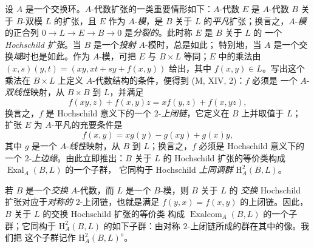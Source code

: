 \begin{env}[18.4.3]
\label{0.18.4.3-fr}
设 $A$ 是一个交换环。$A$-代数扩张的一类重要情形如下：$A$-代数 $E$ 是
$A$-代数 $B$ 关于 $B$-双模 $L$ 的扩张，且 $E$ 作为 $A$-\emph{模}，是
$B$ 关于 $L$ 的\emph{平凡}扩张；换言之，$A$-\emph{模}的正合列
$0\to L\to E\to B\to0$ 是\emph{分裂的}。此时称 $E$ 是 $B$ 关于 $L$ 的
一个 \emph{Hochschild 扩张}。当 $B$ 是一个\emph{投射} $A$-模时，总是如此；
特别地，当 $A$ 是一个交换\emph{域}时也是如此。作为 $A$-模，可把 $E$ 与
$B\times L$ 等同；$E$ 中的乘法由
$(x,s)(y,t)=(xy,xt+sy+f(x,y))$ 给出，其中 $f(x,y)\in L$。写出这个乘法在
$B\times L$ 上定义 $A$-代数结构的条件，便得到 (M, XIV, 2)：$f$ 必须是
一个 $A$-\emph{双线性}映射，从 $B\times B$ 到 $L$，并满足
\begin{equation}
\label{0.18.4.3.1-fr}
\tag{18.4.3.1}
  f(xy,z)+f(x,y)z=xf(y,z)+f(x,yz),
\end{equation}
换言之，$f$ 是 Hochschild 意义下的一个 $2$-\emph{上闭链}，它定义在 $B$
上并取值于 $L$；
扩张 $E$ 为 $A$-平凡的充要条件是
\begin{equation}
\label{0.18.4.3.2-fr}
\tag{18.4.3.2}
  f(x,y)=xg(y)-g(xy)+g(x)y,
\end{equation}
其中 $g$ 是一个 $A$-\emph{线性}映射，从 $B$ 到 $L$；换言之，$f$ 必须是
Hochschild 意义下的一个 $2$-\emph{上边缘}。由此立即推出：$B$ 关于 $L$ 的
Hochschild 扩张的等价类构成 $\operatorname{Exal}_A(B,L)$ 的一个子群，
它同构于 Hochschild \emph{上同调群} $\mathrm H_A^2(B,L)$。

若 $B$ 是一个\emph{交换} $A$-代数，而 $L$ 是一个 $B$-模，则 $B$ 关于 $L$ 的
\emph{交换} Hochschild 扩张对应于\emph{对称的} $2$-上闭链，也就是满足
$f(y,x)=f(x,y)$ 的上闭链。因此，$B$ 关于 $L$ 的交换 Hochschild 扩张的等价类
构成 $\operatorname{Exalcom}_A(B,L)$ 的一个子群；它同构于
$\mathrm H_A^2(B,L)$ 的如下子群：由对称 $2$-上闭链所成的群在其中的像。我们把
这个子群记作 $\mathrm H_A^2(B,L)^s$。
\end{env}

